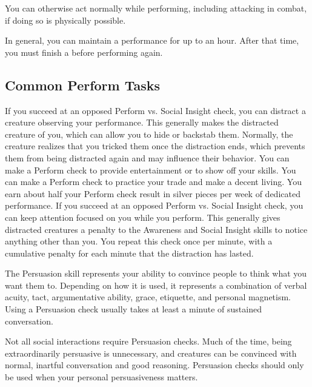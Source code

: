             You can otherwise act normally while performing, including attacking in combat, if doing so is physically possible.

        In general, you can maintain a performance for up to an hour.
        After that time, you must finish a  before performing again.

    \subsection{Common Perform Tasks}
         If you succeed at an opposed Perform vs. Social Insight check, you can distract a creature observing your performance.
        This generally makes the distracted creature  \partiallyunaware of you, which can allow you to hide or backstab them.
        Normally, the creature realizes that you tricked them once the distraction ends, which prevents them from being distracted again and may influence their behavior.
         You can make a Perform check to provide entertainment or to show off your skills.
         You can make a Perform check to practice your trade and make a decent living.
        You earn about half your Perform check result in silver pieces per week of dedicated performance.
         If you succeed at an opposed Perform vs. Social Insight check, you can keep attention focused on you while you perform.
        This generally gives distracted creatures a  penalty to the Awareness and Social Insight skills to notice anything other than you.
        You repeat this check once per minute, with a cumulative  penalty for each minute that the distraction has lasted.

\newpage
{}
        The Persuasion skill represents your ability to convince people to think what you want them to.
        Depending on how it is used, it represents a combination of verbal acuity, tact, argumentative ability, grace, etiquette, and personal magnetism.
        Using a Persuasion check usually takes at least a minute of sustained conversation.

        Not all social interactions require Persuasion checks. Much of the time, being extraordinarily persuasive is unnecessary, and creatures can be convinced with normal, inartful conversation and good reasoning. Persuasion checks should only be used when your personal persuasiveness matters.


